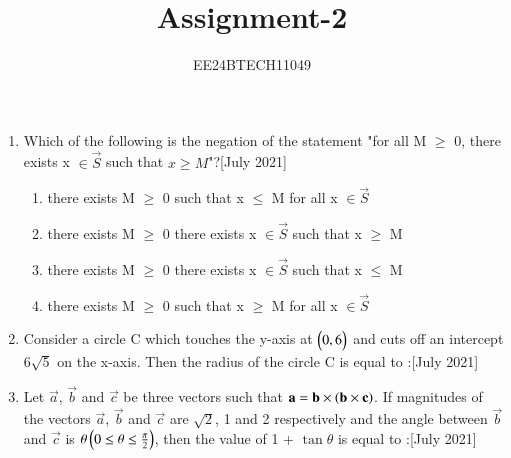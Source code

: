 \documentclass[journal,12pt,onecolumn]{IEEEtran}
\theoremstyle{remark}
\begin{document}

\vspace{3cm}

\title{Assignment-2}
\author{EE24BTECH11049}
{\let\newpage\relax\maketitle}

\renewcommand{\thefigure}{\theenumi}
\renewcommand{\thetable}{\theenumi}
\begin{enumerate}
	\item Which of the following is the negation of the statement "for all M $\geq$ 0, there exists x $\in \vec{S}$ such that $x\geq M$"?\hfill{[July 2021]}
		\begin{enumerate}
			\item there exists M $\geq$ 0 such that x $\leq$ M for all x $\in \vec{S}$
			\item there exists M $\geq$ 0 there exists x $\in \vec{S}$ such that x $\geq$ M
			\item there exists M $\geq$ 0 there exists x $\in \vec{S}$ such that x $\leq$ M
			\item there exists M $\geq$ 0 such that x $\geq$ M for all x $\in \vec{S}$
		\end{enumerate}
	\item Consider a circle C which touches the y-axis at $\begin{pmatrix}0,6\end{pmatrix}$ and cuts off an intercept $6\sqrt{5}$ on the x-axis. Then the radius of the circle C is equal to :\hfill{[July 2021]}
		\begin{enumerate}
		\end{enumerate}
	\item Let $\vec{a}$, $\vec{b}$ and $\vec{c}$ be three vectors such that $\mathbf{a} = \mathbf{b} \times \left(\mathbf{b} \times \mathbf{c}\right)$. If magnitudes of the vectors $\vec{a}$, $\vec{b}$ and $\vec{c}$ are $\sqrt{2}$, 1 and 2 respectively and the angle between $\vec{b}$ and $\vec{c}$ is $\theta \left(0 \leq \theta \leq \frac{\pi}{2}\right)$, then the value of 1 + $\tan{\theta}$ is equal to :\hfill{[July 2021]}

\end{enumerate}
\end{document}
